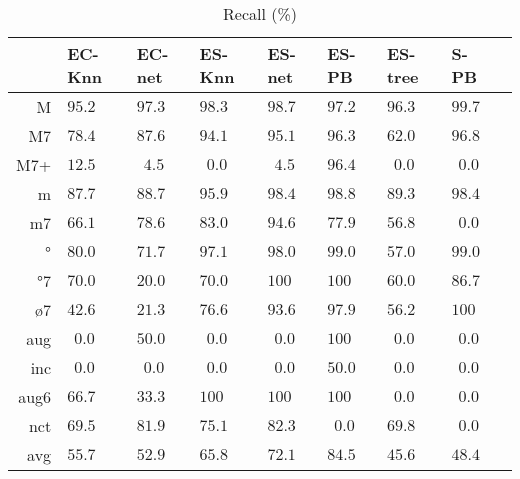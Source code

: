 \documentclass{article}
\begin{document}
\begin{table}
  \centering
\begin{tabular}{r|p{0.5cm}p{0.5cm}p{0.5cm}p{0.5cm}p{0.5cm}p{0.5cm}p{0.5cm}p{0.5cm}}
     &   EC-Knn &   EC-net &   ES-Knn &   ES-net &    ES-PB &  ES-tree &     S-PB \\ \hline
   M & $  95.2$ & $  97.3$ & $  98.3$ & $  98.7$ & $  97.2$ & $  96.3$ & $  99.7$ \\
  M7 & $  78.4$ & $  87.6$ & $  94.1$ & $  95.1$ & $  96.3$ & $  62.0$ & $  96.8$ \\
 M7+ & $  12.5$ & $ ~~4.5$ & $ ~~0.0$ & $ ~~4.5$ & $  96.4$ & $ ~~0.0$ & $ ~~0.0$ \\
   m & $  87.7$ & $  88.7$ & $  95.9$ & $  98.4$ & $  98.8$ & $  89.3$ & $  98.4$ \\
  m7 & $  66.1$ & $  78.6$ & $  83.0$ & $  94.6$ & $  77.9$ & $  56.8$ & $ ~~0.0$ \\
   ° & $  80.0$ & $  71.7$ & $  97.1$ & $  98.0$ & $  99.0$ & $  57.0$ & $  99.0$ \\
  °7 & $  70.0$ & $  20.0$ & $  70.0$ & $ 100  $ & $ 100  $ & $  60.0$ & $  86.7$ \\
  ø7 & $  42.6$ & $  21.3$ & $  76.6$ & $  93.6$ & $  97.9$ & $  56.2$ & $ 100$ \\
 aug & $ ~~0.0$ & $  50.0$ & $ ~~0.0$ & $ ~~0.0$ & $ 100  $ & $ ~~0.0$ & $ ~~0.0$ \\
 inc & $ ~~0.0$ & $ ~~0.0$ & $ ~~0.0$ & $ ~~0.0$ & $  50.0$ & $ ~~0.0$ & $ ~~0.0$ \\
aug6 & $  66.7$ & $  33.3$ & $ 100  $ & $ 100  $ & $ 100  $ & $ ~~0.0$ & $ ~~0.0$ \\
 nct & $  69.5$ & $  81.9$ & $  75.1$ & $  82.3$ & $ ~~0.0$ & $  69.8$ & $ ~~0.0$ \\
\hline                                                       
 avg & $  55.7$ & $  52.9$ & $  65.8$ & $  72.1$ & $  84.5$ & $  45.6$ & $  48.4$ \\
\end{tabular}


  \caption{Recall (\%)}
  \label{tab:recall}
\end{table}
\end{document}
